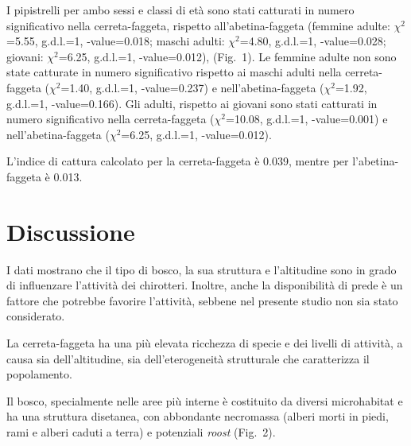 \begin{multicols}{2}
I pipistrelli per ambo sessi e classi di età sono stati catturati in numero significativo nella cerreta-faggeta, rispetto all’abetina-faggeta (femmine adulte: $\chi^2$=5.55, g.d.l.=1, \prob{}-value=0.018; maschi adulti: $\chi^2$=4.80, g.d.l.=1, \prob{}-value=0.028; giovani: $\chi^2$=6.25, g.d.l.=1, \prob{}-value=0.012), (Fig.~1). Le femmine adulte non sono state catturate in numero significativo rispetto ai maschi adulti nella cerreta-faggeta ($\chi^2$=1.40, g.d.l.=1, \prob{}-value=0.237) e nell’abetina-faggeta ($\chi^2$=1.92, g.d.l.=1, \prob{}-value=0.166). Gli adulti, rispetto ai giovani sono stati catturati in numero significativo nella cerreta-faggeta ($\chi^2$=10.08, g.d.l.=1, \prob{}-value=0.001) e nell’abetina-faggeta ($\chi^2$=6.25, g.d.l.=1, \prob{}-value=0.012).

L’indice di cattura calcolato per la cerreta-faggeta è 0.039, mentre per l’abetina-faggeta è 0.013.

\section*{Discussione}
I dati mostrano che il tipo di bosco, la sua struttura e l’altitudine sono in grado di influenzare l’attività dei chirotteri. Inoltre, anche la disponibilità di prede è un fattore che potrebbe favorire l’attività, sebbene nel presente studio non sia stato considerato.

La cerreta-faggeta ha una più elevata ricchezza di specie e dei livelli di attività, a causa sia dell’altitudine, sia dell’eterogeneità strutturale che caratterizza il popolamento. 

Il bosco, specialmente nelle aree più interne è costituito da diversi microhabitat e ha una struttura disetanea, con abbondante necromassa (alberi morti in piedi, rami e alberi caduti a terra) e potenziali \textit{roost} (Fig.~2).    


\end{multicols}
